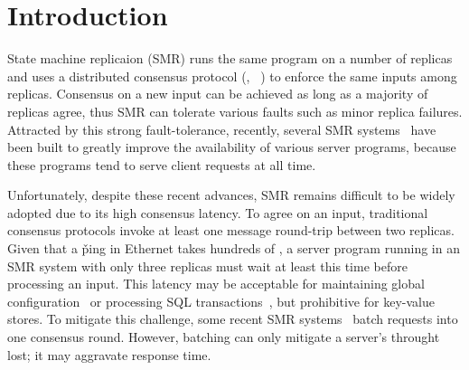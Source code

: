 \section{Introduction} \label{sec:intro}

State machine replicaion (SMR) runs the same program on a 
number of replicas and uses a distributed consensus protocol (\eg, 
\paxos~\cite{crane:sosp15}) to enforce the same inputs among 
replicas. Consensus on a new input can be achieved as long as a majority 
of replicas agree, thus SMR can tolerate various faults such as minor replica 
failures. Attracted by this strong fault-tolerance, recently, several SMR 
systems~\cite{chubby:osdi, zookeeper, crane:sosp15, eve:osdi12, rex:eurosys14} 
have been built to greatly improve the availability of various server programs, 
because these programs tend to serve client requests at all time.

Unfortunately, despite these recent advances, SMR remains difficult to be 
widely adopted due to its high consensus latency. To agree on an input, 
traditional consensus protocols invoke at least one message round-trip between 
two replicas. Given that a \v{ping} in Ethernet takes hundreds of \us, a server 
program running in an SMR system with only three replicas must wait at least 
this time before processing an input. This latency may be acceptable for 
maintaining global configuration~\cite{chubby:osdi,zookeeper} or processing SQL 
transactions~\cite{crane:sosp15,eve:osdi12}, but prohibitive for 
key-value stores. To mitigate this challenge, some recent SMR 
systems~\cite{calvin:sigmod12,rex:eusorys14} batch requests into one 
consensus round. However, batching can only mitigate a server's throught lost; 
it may aggravate response time.


